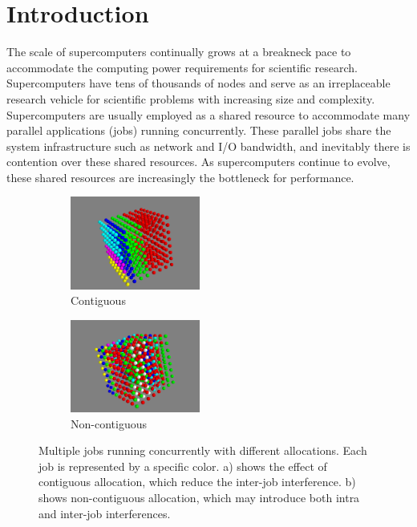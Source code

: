 \documentclass[conference]{IEEEtran}
\begin{document}
\section{Introduction} 
\label{sec: intro}

The scale of supercomputers continually grows at a breakneck pace to accommodate the computing power requirements for scientific research. Supercomputers have tens of thousands of nodes and serve as an irreplaceable research vehicle for scientific problems with increasing size and complexity. Supercomputers are usually employed as a shared resource to accommodate many parallel applications (jobs) running concurrently.  These parallel jobs share the system infrastructure such as network and I/O bandwidth, and inevitably there is contention over these shared resources. As supercomputers continue to evolve, these shared resources are increasingly the bottleneck for performance.


\begin{figure}[h!]
    \centering
    \begin{subfigure}[t]{0.2\textwidth}
        \centering
        \includegraphics[height=1.2in]{figs/goodallocation}
        \caption{Contiguous}
        \label{fig:overview_sub1}
    \end{subfigure}%
    \hspace{1em}%
    \begin{subfigure}[t]{0.2\textwidth}
        \centering
        \includegraphics[height=1.2in]{figs/badallocation}
        \caption{Non-contiguous}
        \label{fig:overview_sub2}
    \end{subfigure}%
   \caption{Multiple jobs running concurrently with different allocations. Each job is represented by a specific color. a) shows the effect of contiguous allocation, which reduce the inter-job interference. b) shows non-contiguous allocation, which may introduce both intra and inter-job interferences. }
   \label{fig:overview}
\end{figure}
\end{document}
